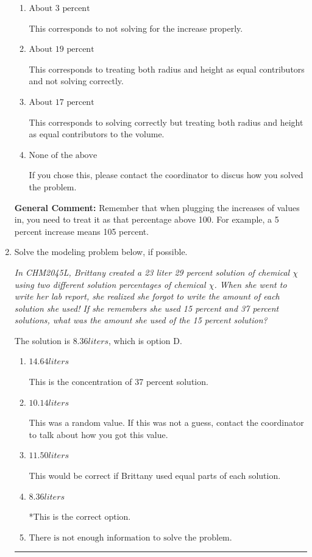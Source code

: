 \documentclass{extbook}[14pt]
\newcommand{\litem}[1]{\item #1

\rule{\textwidth}{0.4pt}}
\begin{document}
\begin{enumerate}
{\begin{enumerate}[label=\Alph*.]
* This is the correct option.
\item \( \text{About } 3 \text{ percent} \)

This corresponds to not solving for the increase properly.
\item \( \text{About } 19 \text{ percent} \)

This corresponds to treating both radius and height as equal contributors and not solving correctly.
\item \( \text{About } 17 \text{ percent} \)

This corresponds to solving correctly but treating both radius and height as equal contributors to the volume.
\item \( \text{None of the above} \)

If you chose this, please contact the coordinator to discus how you solved the problem.
\end{enumerate}

\textbf{General Comment:} Remember that when plugging the increases of values in, you need to treat it as that percentage above 100. For example, a 5 percent increase means 105 percent.
}
\litem{
Solve the modeling problem below, if possible.

\begin{center}
    \textit{ In CHM2045L, Brittany created a 23 liter 29 percent solution of chemical $\chi$ using two different solution percentages of chemical $\chi$. When she went to write her lab report, she realized she forgot to write the amount of each solution she used! If she remembers she used 15 percent and 37 percent solutions, what was the amount she used of the 15 percent solution? }
\end{center}
The solution is \( 8.36 liters \), which is option D.\begin{enumerate}[label=\Alph*.]
\item \( 14.64 liters \)

This is the concentration of 37 percent solution.
\item \( 10.14 liters \)

This was a random value. If this was not a guess, contact the coordinator to talk about how you got this value.
\item \( 11.50 liters \)

This would be correct if Brittany used equal parts of each solution.
\item \( 8.36 liters \)

*This is the correct option.
\item \( \text{There is not enough information to solve the problem.} \)


\end{enumerate}}
\end{enumerate}
\end{document}
